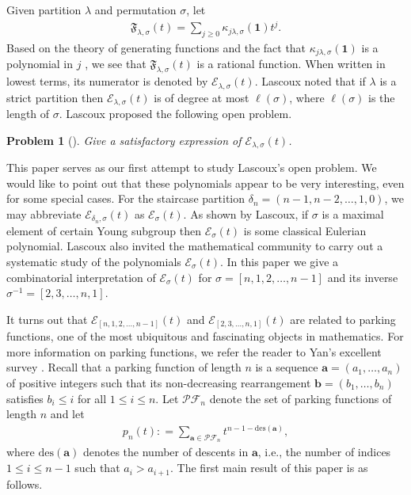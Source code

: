 \documentclass[12pt]{article}
\newtheorem{prob}[thm]{Problem}
\newcommand{\PF}{\mathcal{PF}}
\newcommand{\PP}{p}
\numberwithin{equation}{section}
\begin{document}
Given partition $\lambda$ and permutation $\sigma$, let 
\begin{align*}%
\mathfrak{F}_{\lambda, \sigma}(t)=\sum_{j\geq 0} \kappa_{j\lambda, \sigma}(\textbf{1}) t^j.
\end{align*}
Based on the theory of generating functions and the fact that $\kappa_{j\lambda, \sigma}(\textbf{1})$ is a polynomial in $j$ \cite{Valentina-Kirichenko-Smirnov-2012}, we see that 
$\mathfrak{F}_{\lambda, \sigma}(t)$ is a rational function. When written in lowest terms, its numerator is denoted by  $\mathcal{E}_{\lambda, \sigma}(t)$. Lascoux noted that if  $\lambda$ is a strict partition then 
$\mathcal{E}_{\lambda, \sigma}(t)$ is of degree at most $\ell(\sigma)$, where $\ell(\sigma)$ is the length of $\sigma$.
Lascoux \cite{Lascoux-2016} proposed the following open problem.

\begin{prob}[{\cite[P. 262]{Lascoux-2016}}] \label{prob-Lascoux}
Give a satisfactory expression of ${\mathcal{E}}_{\lambda,\sigma}(t)$.
\end{prob}

This paper serves as our first attempt to study Lascoux's open problem. We would like to point out that these polynomials appear to be very interesting, even for some special cases. 
For the staircase partition $\delta_n=(n-1,n-2,\ldots,1,0)$, we may abbreviate 
${\mathcal{E}}_{\delta_n, \sigma}(t)$ as ${\mathcal{E}}_{\sigma}(t)$.
As shown by Lascoux, if $\sigma$ is a maximal element of certain Young subgroup then $\mathcal{E}_{\sigma}(t)$ is some classical Eulerian polynomial. Lascoux also invited the mathematical community to carry out a systematic study of the polynomials ${\mathcal{E}}_{\sigma}(t)$.
In this paper we give a combinatorial interpretation of 
${\mathcal{E}}_{\sigma}(t)$ for $\sigma=[n, 1,2,\ldots,n-1]$ and its inverse $\sigma^{-1}=[2,3,\ldots,n,1]$. 

It turns out that ${\mathcal{E}}_{[n, 1,2,\ldots,n-1]}(t)$ and ${\mathcal{E}}_{[2,3,\ldots,n,1]}(t)$ are related to parking functions, one of the most ubiquitous and fascinating objects in mathematics. 
For more information on parking functions, we refer the reader to Yan's excellent survey \cite{Yan-2015}. Recall that a parking function of length $n$ is a sequence $\mathbf{a} = (a_1, \ldots, a_n)$ of positive integers such that its non-decreasing rearrangement $\mathbf{b} = (b_1, \ldots, b_n)$ satisfies $b_i \le i$ for all $1\leq i\leq n$.
Let $\PF_n$ denote the set of parking functions of length $n$ and let 
\begin{align}\label{eq-gf-parkingfunction}
\PP_n(t):
=\sum_{\mathbf{a}\in \PF_n}t^{n-1-\mathrm{des}(\mathbf{a})}, 
\end{align}
where $\mathrm{des}(\mathbf{a})$ denotes the number of descents in $\mathbf{a}$, i.e., the number of indices $1\leq i\leq n-1$ such that $a_i> a_{i+1}$. 
The first main result of this paper is  as follows.
\end{document}
